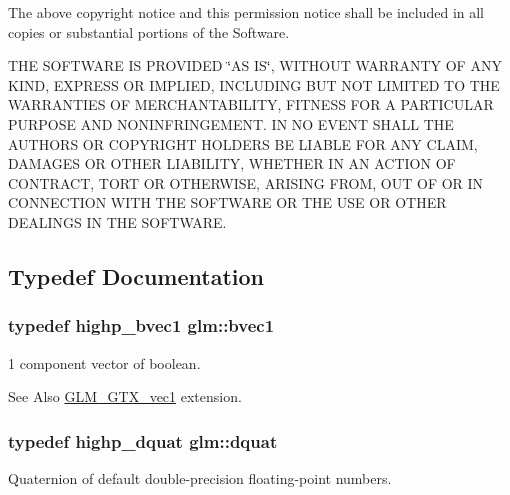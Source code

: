 The above copyright notice and this permission notice shall be included in all copies or substantial portions of the Software.

T\-H\-E S\-O\-F\-T\-W\-A\-R\-E I\-S P\-R\-O\-V\-I\-D\-E\-D \char`\"{}\-A\-S I\-S\char`\"{}, W\-I\-T\-H\-O\-U\-T W\-A\-R\-R\-A\-N\-T\-Y O\-F A\-N\-Y K\-I\-N\-D, E\-X\-P\-R\-E\-S\-S O\-R I\-M\-P\-L\-I\-E\-D, I\-N\-C\-L\-U\-D\-I\-N\-G B\-U\-T N\-O\-T L\-I\-M\-I\-T\-E\-D T\-O T\-H\-E W\-A\-R\-R\-A\-N\-T\-I\-E\-S O\-F M\-E\-R\-C\-H\-A\-N\-T\-A\-B\-I\-L\-I\-T\-Y, F\-I\-T\-N\-E\-S\-S F\-O\-R A P\-A\-R\-T\-I\-C\-U\-L\-A\-R P\-U\-R\-P\-O\-S\-E A\-N\-D N\-O\-N\-I\-N\-F\-R\-I\-N\-G\-E\-M\-E\-N\-T. I\-N N\-O E\-V\-E\-N\-T S\-H\-A\-L\-L T\-H\-E A\-U\-T\-H\-O\-R\-S O\-R C\-O\-P\-Y\-R\-I\-G\-H\-T H\-O\-L\-D\-E\-R\-S B\-E L\-I\-A\-B\-L\-E F\-O\-R A\-N\-Y C\-L\-A\-I\-M, D\-A\-M\-A\-G\-E\-S O\-R O\-T\-H\-E\-R L\-I\-A\-B\-I\-L\-I\-T\-Y, W\-H\-E\-T\-H\-E\-R I\-N A\-N A\-C\-T\-I\-O\-N O\-F C\-O\-N\-T\-R\-A\-C\-T, T\-O\-R\-T O\-R O\-T\-H\-E\-R\-W\-I\-S\-E, A\-R\-I\-S\-I\-N\-G F\-R\-O\-M, O\-U\-T O\-F O\-R I\-N C\-O\-N\-N\-E\-C\-T\-I\-O\-N W\-I\-T\-H T\-H\-E S\-O\-F\-T\-W\-A\-R\-E O\-R T\-H\-E U\-S\-E O\-R O\-T\-H\-E\-R D\-E\-A\-L\-I\-N\-G\-S I\-N T\-H\-E S\-O\-F\-T\-W\-A\-R\-E. 

\subsection{Typedef Documentation}
\hypertarget{namespaceglm_a30260c045e085bb8d19eddca772cac61}{
\subsubsection[{bvec1}]{\setlength{\rightskip}{0pt plus 5cm}typedef {\bf highp\-\_\-bvec1} {\bf glm\-::bvec1}}}\label{namespaceglm_a30260c045e085bb8d19eddca772cac61}
1 component vector of boolean. \begin{DoxySeeAlso}{See Also}
\hyperlink{group__gtx__vec1}{G\-L\-M\-\_\-\-G\-T\-X\-\_\-vec1} extension. 
\end{DoxySeeAlso}
\hypertarget{namespaceglm_a49693161673a003b4a8fd4d8b15b0b7b}{
\subsubsection[{dquat}]{\setlength{\rightskip}{0pt plus 5cm}typedef {\bf highp\-\_\-dquat} {\bf glm\-::dquat}}}\label{namespaceglm_a49693161673a003b4a8fd4d8b15b0b7b}
Quaternion of default double-\/precision floating-\/point numbers.

